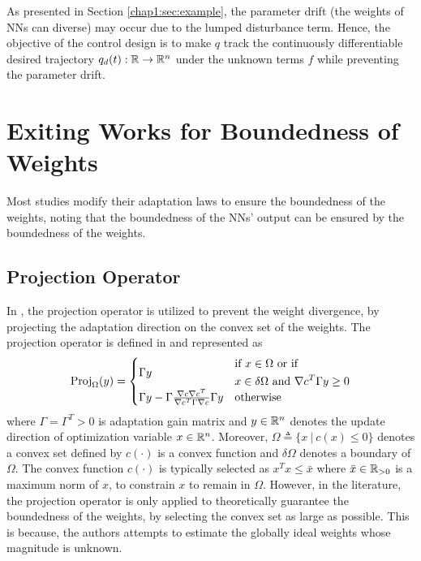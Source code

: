 As presented in Section \ref{chap1:sec:example}, the parameter drift (\ie the weights of NNs can diverse) may occur due to the lumped disturbance term.
Hence, the objective of the control design is to make $q$ track the continuously differentiable desired trajectory $q_d(t):\mathbb{R}\to \mathbb{R}^n$ under the unknown terms $f$ while preventing the parameter drift.

\section{Exiting Works for Boundedness of Weights} 

Most studies modify their adaptation laws to ensure the boundedness of the weights, noting that the boundedness of the NNs' output can be ensured by the boundedness of the weights.

\subsection{Projection Operator} \label{chap3:sec:proj}

In \cite{RN13, RN11, RN21}, the projection operator is utilized to prevent the weight divergence, by projecting the adaptation direction on the convex set of the weights.
The projection operator is defined in \cite[Appendix E, eq.~(E.4)]{RN7} and represented as
\begin{equation}
    \text{Proj}_\Omega(y)
    =
    \begin{cases}
        \Gamma y
        &
        \begin{aligned}
            &\text{if }x\in\Omega
            \text{ or if }\\
            &x\in\delta\Omega
            \text{ and }
            \nabla c^T\Gamma y\ge0
        \end{aligned}
        \\
        \Gamma y
        -
        \Gamma
        {\nabla c\nabla c^T\over \nabla c^T \Gamma \nabla c}
        \Gamma y
        &
        \text{otherwise}
    \end{cases}
    \label{chap3:eq:proj}
\end{equation}
where $\Gamma=\Gamma^T>0$ is adaptation gain matrix and $y\in\mathbb{R}^n$ denotes the update direction of optimization variable $x\in\mathbb{R}^n$.
Moreover, $\Omega\triangleq \{x\ \vert\ c(x)\le 0\}$ denotes a convex set defined by $c(\cdot)$ is a convex function and $\delta\Omega$ denotes a boundary of $\Omega$.
The convex function $c(\cdot)$ is typically selected as $x^Tx\le \bar x$ where $\bar x\in\mathbb{R}_{>0}$ is a maximum norm of $x$, to constrain $x$ to remain in $\Omega$.
However, in the literature, the projection operator is only applied to theoretically guarantee the boundedness of the weights, by selecting the convex set as large as possible.
This is because, the authors attempts to estimate the globally ideal weights whose magnitude is unknown.


